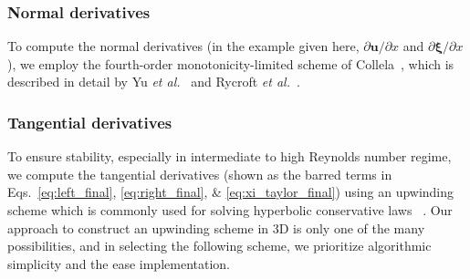 \documentclass[times, 10pt]{article}
\renewcommand{\vec}[1]{\mathbf{#1}}
\newcommand{\p}{\partial}
\newcommand{\vu}{\vec{u}}
\newcommand{\vxi}{\boldsymbol\xi}
\begin{document}
\subsubsection*{Normal derivatives}
\label{sub:norm}

To compute the normal derivatives (in the example given here, $\p \vu/\p x$ and  $\p \vxi/\p x$), we employ the fourth-order monotonicity-limited scheme of Collela~\cite{colella90}, which is described in detail by Yu \textit{et al.}~\cite{yu03} and Rycroft \textit{et al.}~\cite{rycroft20}.

\subsubsection*{Tangential derivatives}
\label{sub:tang}

To ensure stability, especially in intermediate to high Reynolds number regime, we compute the tangential derivatives (shown as the barred terms in Eqs.~\eqref{eq:left_final}, \eqref{eq:right_final}, \& \eqref{eq:xi_taylor_final}) using an upwinding scheme which is commonly used for solving hyperbolic conservative laws ~\cite{bell89,almgren96,sussman99,yu03}.
Our approach to construct an upwinding scheme in 3D is only one of the many possibilities, and in selecting the following scheme, we prioritize algorithmic simplicity and the ease implementation.
\end{document}
